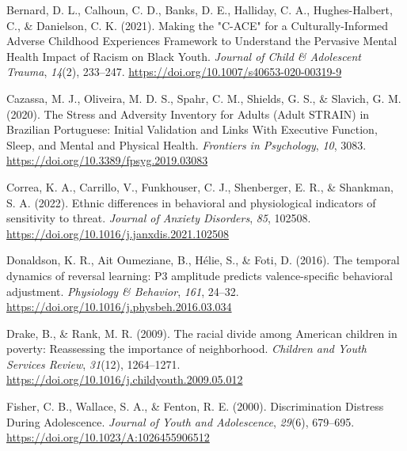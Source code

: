 \documentclass[
  man]{apa7}
\newlength{\cslhangindent}
\newlength{\cslentryspacingunit} %
\newenvironment{CSLReferences}[2] %
 {%
  \setlength{\parindent}{0pt}
  \ifodd #1
  \let\oldpar\par
  \def\par{\hangindent=\cslhangindent\oldpar}
  \fi
  \setlength{\parskip}{#2\cslentryspacingunit}
 }%
 {}
\begin{document}
\hypertarget{refs}{}
\begin{CSLReferences}{1}{0}
\leavevmode{}%
Bernard, D. L., Calhoun, C. D., Banks, D. E., Halliday, C. A., Hughes-Halbert, C., \& Danielson, C. K. (2021). Making the "{C-ACE}" for a {Culturally-Informed Adverse Childhood Experiences Framework} to {Understand} the {Pervasive Mental Health Impact} of {Racism} on {Black Youth}. \emph{Journal of Child \& Adolescent Trauma}, \emph{14}(2), 233--247. \url{https://doi.org/10.1007/s40653-020-00319-9}

\leavevmode{}%
Cazassa, M. J., Oliveira, M. D. S., Spahr, C. M., Shields, G. S., \& Slavich, G. M. (2020). The {Stress} and {Adversity Inventory} for {Adults} ({Adult STRAIN}) in {Brazilian Portuguese}: {Initial Validation} and {Links With Executive Function}, {Sleep}, and {Mental} and {Physical Health}. \emph{Frontiers in Psychology}, \emph{10}, 3083. \url{https://doi.org/10.3389/fpsyg.2019.03083}

\leavevmode{}%
Correa, K. A., Carrillo, V., Funkhouser, C. J., Shenberger, E. R., \& Shankman, S. A. (2022). Ethnic differences in behavioral and physiological indicators of sensitivity to threat. \emph{Journal of Anxiety Disorders}, \emph{85}, 102508. \url{https://doi.org/10.1016/j.janxdis.2021.102508}

\leavevmode{}%
Donaldson, K. R., Ait Oumeziane, B., Hélie, S., \& Foti, D. (2016). The temporal dynamics of reversal learning: {P3} amplitude predicts valence-specific behavioral adjustment. \emph{Physiology \& Behavior}, \emph{161}, 24--32. \url{https://doi.org/10.1016/j.physbeh.2016.03.034}

\leavevmode{}%
Drake, B., \& Rank, M. R. (2009). The racial divide among {American} children in poverty: {Reassessing} the importance of neighborhood. \emph{Children and Youth Services Review}, \emph{31}(12), 1264--1271. \url{https://doi.org/10.1016/j.childyouth.2009.05.012}

\leavevmode{}%
Fisher, C. B., Wallace, S. A., \& Fenton, R. E. (2000). Discrimination {Distress During Adolescence}. \emph{Journal of Youth and Adolescence}, \emph{29}(6), 679--695. \url{https://doi.org/10.1023/A:1026455906512}


\end{CSLReferences}
\end{document}
